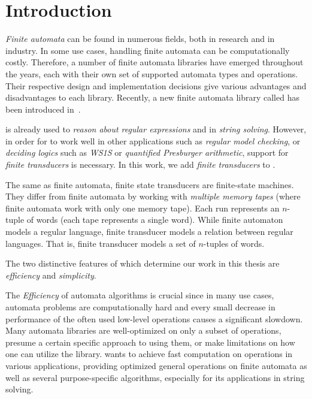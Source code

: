 
% 

\chapter{Introduction}

\emph{Finite automata} can be found in numerous fields, both in research and in industry.
In some use cases, handling finite automata can be computationally costly.
Therefore, a number of finite automata libraries have emerged throughout the years, each with their own set of supported automata types and operations.
Their respective design and implementation decisions give various advantages and disadvantages to each library.
Recently, a new finite automata library called \mata has been introduced in~\cite{tacas24_mata_10.1007/978-3-031-57249-4_7}.

\mata is already used to \emph{reason about regular expressions} and in \emph{string solving}.
However, in order for \mata to work well in other applications such as \emph{regular model checking}, or \emph{deciding logics} such as \emph{WS1S} or \emph{quantified Presburger arithmetic}, support for \emph{finite transducers} is necessary.
In this work, we add \emph{finite transducers} to \mata.

The same as finite automata, finite state transducers are finite-state machines.
They differ from finite automata by working with \emph{multiple memory tapes} (where finite automata work with only one memory tape).
Each run represents an $n$-tuple of words (each tape represents a single word).
While finite automaton models a regular language, finite transducer models a relation between regular languages.
That is, finite transducer models a set of $n$-tuples of words.

The two distinctive features of \mata which determine our work in this thesis are \emph{efficiency} and \emph{simplicity}.

The \emph{Efficiency} of automata algorithms is crucial since in many use cases, automata problems are computationally hard and every small decrease in performance of the often used low-level operations causes a significant slowdown.
Many automata libraries are well-optimized on only a subset of operations, presume a certain specific approach to using them, or make limitations on how one can utilize the library.
\mata wants to achieve fast computation on operations in various applications, providing optimized general operations on finite automata as well as several purpose-specific algorithms, especially for its applications in string solving.

